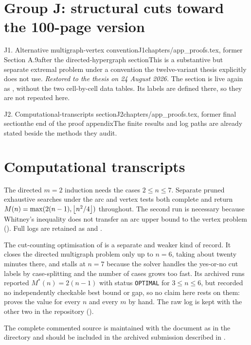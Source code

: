 \section*{Group J: structural cuts toward the 100-page version}

\begin{offcut}{J1. Alternative multigraph-vertex convention}{J1}{chapters/app\_proofs.tex, former Section A.9}{after the directed-hypergraph section}{This is a substantive but separate extremal problem under a convention the twelve-variant thesis explicitly does not use.}
\emph{Restored to the thesis on 24 August 2026.} The section is live again as , without the two cell-by-cell data tables. Its labels are defined there, so they are not repeated here.
\end{offcut}

\begin{offcut}{J2. Computational-transcripts section}{J2}{chapters/app\_proofs.tex, former final section}{the end of the proof appendix}{The finite results and log paths are already stated beside the methods they audit.}
\section{Computational transcripts}

The directed $m=2$ induction needs the cases $2\le n\le7$. Separate pruned
exhaustive searches under the arc and vertex tests both complete and return
$M(n)=\max(2(n-1),\left\lfloor n^2/4 \right\rfloor)$ throughout. The second run is necessary
because Whitney's inequality does not transfer an arc upper bound to the
vertex problem (). Full logs are retained as
 and
.

The cut-counting optimisation of  is a separate and weaker kind of record. It closes the directed multigraph problem only up to $n = 6$, taking about twenty minutes there, and stalls at $n = 7$ because the solver handles the yes-or-no cut labels by case-splitting and the number of cases grows too fast. Its archived runs reported $M^{*}(n) = 2(n-1)$ with status \texttt{OPTIMAL} for $3 \le n \le 6$, but recorded no independently checkable best bound or gap, so no claim here rests on them:  proves the value for every $n$ and every $m$ by hand. The raw log is kept with the other two in the repository ().

The complete commented source is maintained with the document as  in the  directory and should be included in the archived submission described in .
\end{offcut}

